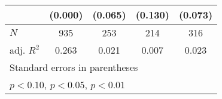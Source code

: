 {\begin{tabular}{l*{4}{c}}
            &     (0.000)         &     (0.065)         &     (0.130)         &     (0.073)         \\
\hline
\(N\)       &         935         &         253         &         214         &         316         \\
adj. \(R^{2}\)&       0.263         &       0.021         &       0.007         &       0.023         \\
\hline\hline
\multicolumn{5}{l}{\footnotesize Standard errors in parentheses}\\
\multicolumn{5}{l}{\footnotesize \sym{*} \(p<0.10\), \sym{**} \(p<0.05\), \sym{***} \(p<0.01\)}\\
\end{tabular}
}
